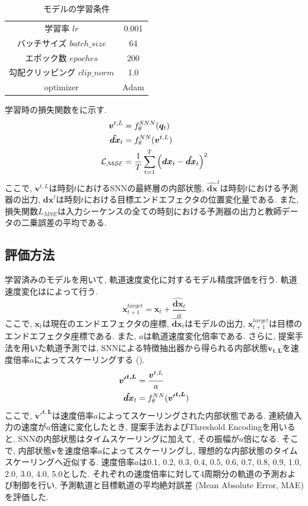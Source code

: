 \begin{table}[htb]
    \centering
    \caption{モデルの学習条件}
    \label{tab:exp3:train:parameter}
    \begin{tabular}{cc}
        \hline
        学習率 $lr$ & 0.001\\
        バッチサイズ $batch\_size$ & 64\\
        エポック数 $epoches$ & 200\\
        勾配クリッピング $clip\_norm$ & 1.0\\
        optimizer & Adam\\
        \hline
    \end{tabular}
\end{table}

学習時の損失関数をに示す.
\begin{align}
    \bm{v}^{t,L} &= f_{\theta}^{SNN}(\bm{q}_{t}) \notag \\
    \bm{\hat{dx}}_{t} &= f_{\theta}^{NN}(\bm{v}^{t,L}) \notag \\
    \mathcal{L_{MSE}} &= \frac{1}{T} \sum_{t=1}^{T} \left( \bm{dx}_{t} - \bm{\hat{dx}}_{t} \right)^2 \label{eq:exp3:loss}
\end{align}
ここで, $\bm{v}^{t,L}$は時刻$t$におけるSNNの最終層の内部状態, $\bm{\hat{dx}}^{t}$は時刻$t$における予測器の出力, $\bm{dx}^{t}$は時刻$t$における目標エンドエフェクタの位置変化量である.
また, 損失関数$L_{MSE}$は入力シーケンスの全ての時刻における予測器の出力と教師データの二乗誤差の平均である.


\subsection{評価方法}
学習済みのモデルを用いて, 軌道速度変化に対するモデル精度評価を行う.
軌道速度変化はによって行う.
\begin{equation}
    \bm{x}_{t+1}^{target} = \bm{x}_{t} + \frac{\bm{\hat{dx}}_{t}} {a} \label{eq:exp3:target_trajectoryx}
\end{equation}
ここで, $\bm{x}_{t}$は現在のエンドエフェクタの座標, $\bm{\hat{dx}}_{t}$はモデルの出力, $\bm{x}_{t+1}^{target}$は目標のエンドエフェクタ座標である.
また, $a$は軌道速度変化倍率である.
さらに, 提案手法を用いた軌道予測では, SNNによる特徴抽出器から得られる内部状態$\bm{v_{t,L}}$を速度倍率$a$によってスケーリングする ().
\begin{align}
    \bm{{v'}^{t,L}} &= \frac{\bm{v}^{t,L}}{a} \notag \\
    \bm{\hat{dx}}_{t} &= f_{\theta}^{NN}(\bm{{v'}^{t,L}}) \label{eq:exp3:fix:volt}
\end{align}
ここで, $\bm{{v'}^{t,L}}$は速度倍率$a$によってスケーリングされた内部状態である.
連続値入力の速度が$a$倍速に変化したとき, 提案手法およびThreshold Encodingを用いると, SNNの内部状態はタイムスケーリングに加えて, その振幅が$a$倍になる.
そこで, 内部状態$\bm{v}$を速度倍率$a$によってスケーリングし, 理想的な内部状態のタイムスケーリングへ近似する.
速度倍率$a$は0.1, 0.2, 0.3, 0.4, 0.5, 0.6, 0.7, 0.8, 0.9, 1.0, 2.0, 3.0, 4.0, 5.0とした.
それぞれの速度倍率に対して4周期分の軌道の予測および制御を行い, 予測軌道と目標軌道の平均絶対誤差 (Mean Absolute Error, MAE) を評価した.

